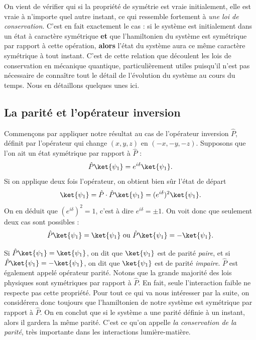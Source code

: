 On vient de vérifier qui si la propriété de symétrie est vraie initialement, elle est vraie à n'importe quel autre instant, ce qui ressemble fortement à \textit{une loi de conservation}. C'est en fait exactement le cas : si le système est initialement dans un état à caractère symétrique \textbf{et} que l'hamiltonien du système est symétrique par rapport à cette opération, \textbf{alors} l'état du système aura ce même caractère symétrique à tout instant. C'est de cette relation que découlent les lois de conservation en mécanique quantique, particulièrement utiles puisqu'il n'est pas nécessaire de connaître tout le détail de l'évolution du système au cours du temps. Nous en détaillons quelques unes ici.

\subsection{La parité et l'opérateur inversion}
Commençons par appliquer notre résultat au cas de l'opérateur inversion $\hat{P}$, définit par l'opérateur qui change $(x,y,z)$ en $(-x,-y,-z)$. Supposons que l'on ait un état symétrique par rapport à $\hat{P}$ : 
\begin{equation*}
\hat{P}\ket{\psi_1} = e^{i\delta}\ket{\psi_1}.
\end{equation*}
Si on applique deux fois l'opérateur, on obtient bien sûr l'état de départ
\begin{equation*}
\ket{\psi_1} = \hat{P}\cdot\hat{P}\ket{\psi_1} = (e^{i\delta})^2\ket{\psi_1}.
\end{equation*}
On en déduit que $(e^{i\delta})^2=1$, c'est à dire $e^{i\delta}=\pm1$. On voit donc que seulement deux cas sont possibles :
\begin{equation*}
\hat{P}\ket{\psi_1} = \ket{\psi_1} \mbox{ ou } \hat{P}\ket{\psi_1} = -\ket{\psi_1}.
\end{equation*}

Si $\hat{P}\ket{\psi_1}= \ket{\psi_1}$, on dit que $\ket{\psi_1}$ est de parité \textit{paire}, et si $\hat{P}\ket{\psi_1}= -\ket{\psi_1}$, on dit que $\ket{\psi_1}$ est de parité \textit{impaire}. $\hat{P}$ est également appelé opérateur parité. Notons que la grande majorité des lois physiques sont symétriques par rapport à $\hat{P}$. En fait, seule l'interaction faible ne respecte pas cette propriété. Pour tout ce qui va nous intéresser par la suite, on considérera donc toujours que l'hamiltonien de notre système est symétrique par rapport à $\hat{P}$. On en conclut que si le système a une parité définie à un instant, alors il gardera la même parité. C'est ce qu'on appelle \textit{la conservation de la parité}, très importante dans les interactions lumière-matière.

